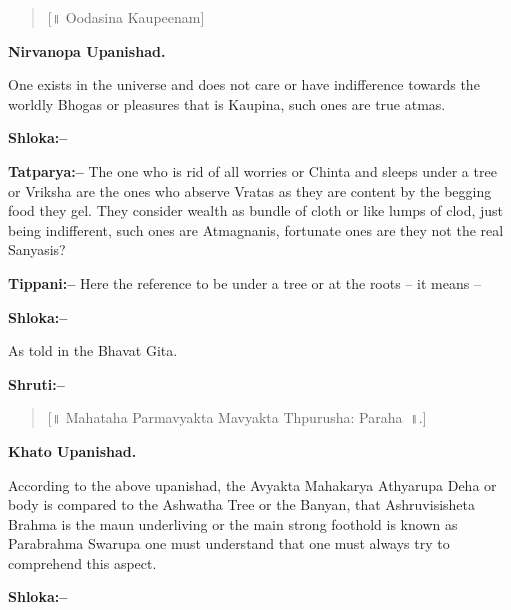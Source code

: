 \begin{verse}
[॥ Oodasina Kaupeenam]
\end{verse}

\begin{flushright}
\textbf{Nirvanopa Upanishad.}
\end{flushright}

One exists in the universe and does not care or have indifference towards the worldly Bhogas or pleasures that is Kaupina, such ones are true atmas.

\textbf{Shloka:–}

\begin{verse}
  
\end{verse}

\textbf{Tatparya:–} The one who is rid of all worries or Chinta and sleeps under a tree or Vriksha are the ones who abserve Vratas as they are content by the begging food they gel. They consider wealth as bundle of cloth or like lumps of clod, just being indifferent, such ones are Atmagnanis, fortunate ones are they not the real Sanyasis?

\textbf{Tippani:–} Here the reference to be under a tree or at the roots – it means –

\textbf{Shloka:–}

\begin{verse}
\dev{[॥ ऊदवरामूला मधाश्याख मश्वीथम प्राहु रव्यम~॥.]}
\end{verse}

As told in the Bhavat Gita.

\textbf{Shruti:–}

\begin{verse}
[॥ Mahataha Parmavyakta Mavyakta Thpurusha: Paraha~॥.]
\end{verse}

\begin{flushright}
\textbf{Khato Upanishad.}
\end{flushright}

According to the above upanishad, the Avyakta Mahakarya Athyarupa Deha or body is compared to the Ashwatha Tree or the Banyan, that Ashruvisisheta Brahma is the maun underliving or the main strong foothold is known as Parabrahma Swarupa one must understand that one must always try to comprehend this aspect.

\textbf{Shloka:–}

\begin{verse}
  
\end{verse}


